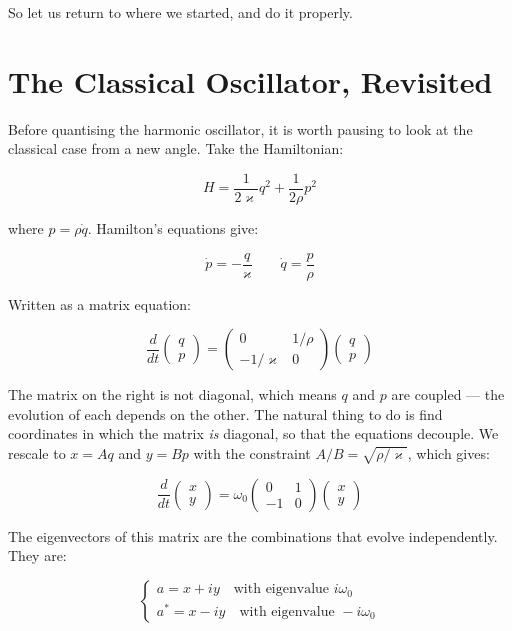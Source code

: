 \documentclass[krantz1,ChapterTOCs]{krantz}
\begin{document}
So let us return to where we started, and do it properly.\\

\section*{The Classical Oscillator, Revisited}

Before quantising the harmonic oscillator, it is worth pausing to 
look at the classical case from a new angle. Take the Hamiltonian:

$$H = \frac{1}{2\varkappa}q^2 + \frac{1}{2\rho}p^2$$

where $p = \rho\dot{q}$. Hamilton's equations give:

$$\dot{p} = -\frac{q}{\varkappa} \qquad \dot{q} = \frac{p}{\rho}$$

Written as a matrix equation:

$$\frac{d}{dt}\begin{pmatrix}q\\p\end{pmatrix} = 
\begin{pmatrix}0 & 1/\rho \\ -1/\varkappa & 0\end{pmatrix}
\begin{pmatrix}q\\p\end{pmatrix}$$

The matrix on the right is not diagonal, which means $q$ and $p$ 
are coupled --- the evolution of each depends on the other. The 
natural thing to do is find coordinates in which the matrix 
\textit{is} diagonal, so that the equations decouple. We 
rescale to $x = Aq$ and $y = Bp$ with the constraint 
$A/B = \sqrt{\rho/\varkappa}$, which gives:

$$\frac{d}{dt}\begin{pmatrix}x\\y\end{pmatrix} = 
\omega_0\begin{pmatrix}0 & 1 \\ -1 & 0\end{pmatrix}
\begin{pmatrix}x\\y\end{pmatrix}$$

The eigenvectors of this matrix are the combinations that evolve 
independently. They are:

$$\begin{cases}
a = x + iy \quad \text{with eigenvalue } i\omega_0 \\[4pt]
a^* = x - iy \quad \text{with eigenvalue } -i\omega_0
\end{cases}$$
\end{document}
